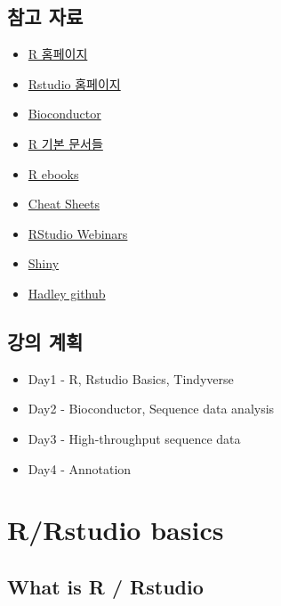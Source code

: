 \documentclass[
]{book}
\providecommand{\tightlist}{%
  \setlength{\itemsep}{0pt}\setlength{\parskip}{0pt}}
\begin{document}
\hypertarget{References}{%
\section{참고 자료}\label{References}}

\begin{itemize}
\tightlist
\item
  \href{https://www.r-project.org/}{R 홈페이지}
\item
  \href{https://www.rstudio.com/}{Rstudio 홈페이지}
\item
  \href{https://www.bioconductor.org/}{Bioconductor}
\item
  \href{https://cran.r-project.org/manuals.html}{R 기본 문서들}
\item
  \href{https://bookdown.org/}{R ebooks}
\item
  \href{https://www.rstudio.com/resources/cheatsheets/}{Cheat Sheets}
\item
  \href{https://resources.rstudio.com/}{RStudio Webinars}
\item
  \href{http://shiny.rstudio.com/tutorial/}{Shiny}
\item
  \href{https://github.com/hadley}{Hadley github}
\end{itemize}

\hypertarget{Schedule}{%
\section{강의 계획}\label{Schedule}}

\begin{itemize}
\tightlist
\item
  Day1 - R, Rstudio Basics, Tindyverse
\item
  Day2 - Bioconductor, Sequence data analysis
\item
  Day3 - High-throughput sequence data
\item
  Day4 - Annotation
\end{itemize}

\hypertarget{rrstudio-basics}{%
\chapter{R/Rstudio basics}\label{rrstudio-basics}}

\hypertarget{what-is-r-rstudio}{%
\section{What is R / Rstudio}\label{what-is-r-rstudio}}
\end{document}
